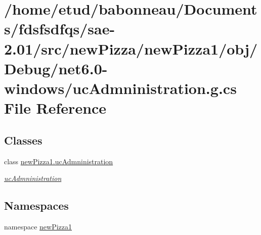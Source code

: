 \hypertarget{Debug_2net6_80-windows_2ucAdmninistration_8g_8cs}{}\section{/home/etud/babonneau/\+Documents/fdsfsdfqs/sae-\/2.01/src/new\+Pizza/new\+Pizza1/obj/\+Debug/net6.0-\/windows/uc\+Admninistration.g.\+cs File Reference}
\label{Debug_2net6_80-windows_2ucAdmninistration_8g_8cs}
\subsection*{Classes}
\begin{DoxyCompactItemize}
\item 
class \hyperlink{classnewPizza1_1_1ucAdmninistration}{new\+Pizza1.\+uc\+Admninistration}
\begin{DoxyCompactList}\small\item\em \hyperlink{classnewPizza1_1_1ucAdmninistration}{uc\+Admninistration} \end{DoxyCompactList}\end{DoxyCompactItemize}
\subsection*{Namespaces}
\begin{DoxyCompactItemize}
\item 
namespace \hyperlink{namespacenewPizza1}{new\+Pizza1}
\end{DoxyCompactItemize}
